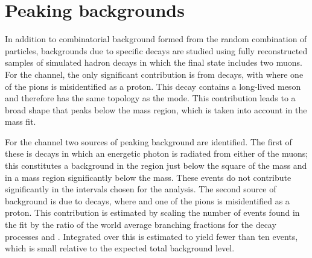 \section{Peaking backgrounds}
\label{sec:physbg}
 In addition to combinatorial background formed from the random
 combination of particles, backgrounds due to specific decays are
 studied using fully reconstructed samples of simulated \bquark hadron
 decays in which the final state includes two muons.  For the
 \decay{\Lb}{\jpsi\Lz} channel, the only significant contribution is
 from \decay{\Bz}{\jpsi\KS} decays, with \decay{\KS}{\pip\pim} where
 one of the pions is misidentified as a proton.  This decay contains a
 long-lived \KS meson and therefore has the same topology as the
 \decay{\Lb}{\jpsi\Lz} mode. This contribution leads to a broad shape
 that peaks below the \Lb mass region, which is taken into account in
 the mass fit.

 For the \decay{\Lb}{\Lz\mumu} channel two sources of peaking
 background are identified. The first of these is
 \decay{\Lb}{\jpsi\Lz} decays in which an energetic photon is radiated
 from either of the muons; this constitutes a background in the \qsq
 region just below the square of the \jpsi mass and in a mass region
 significantly below the \Lb mass.  These events do not contribute
 significantly in the \qsq intervals chosen for the analysis.  The
 second source of background is due to \decay{\Bz}{\KS\mumu} decays,
 where \decay{\KS}{\pip\pim} and one of the pions is misidentified as
 a proton.  This contribution is estimated by scaling the number of
 \decay{\Bz}{\jpsi\KS} events found in the \decay{\Lb}{\jpsi\Lz} fit
 by the ratio of the world average branching fractions for the decay
 processes \decay{\Bz}{\KS\mumu} and \decay{\Bz}{\jpsi(\to\mumu)\KS}
 \cite{Agashe:2014kda}.  Integrated over \qsq this is estimated to
 yield fewer than ten events, which is small relative to the expected
 total background level.
